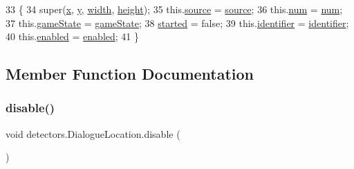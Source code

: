 \begin{DoxyCode}
33                                                                                                            
                                          \{
34         super(\mbox{\hyperlink{classorg_1_1newdawn_1_1slick_1_1geom_1_1_shape_a3e985bfff386c15a4efaad03d8ad60d3}{x}}, \mbox{\hyperlink{classorg_1_1newdawn_1_1slick_1_1geom_1_1_shape_a9f934baded6a1b65ebb69e7e5f80ea00}{y}}, \mbox{\hyperlink{classorg_1_1newdawn_1_1slick_1_1geom_1_1_rectangle_a967e1823f62daf45abb142779d1be62d}{width}}, \mbox{\hyperlink{classorg_1_1newdawn_1_1slick_1_1geom_1_1_rectangle_a3bd010fdce636fc11ed0e0ad4d4b4a0a}{height}});
35         this.\mbox{\hyperlink{classdetectors_1_1_dialogue_location_a55abbd4dc425d54ce35dfae63bd1b1e0}{source}} = \mbox{\hyperlink{classdetectors_1_1_dialogue_location_a55abbd4dc425d54ce35dfae63bd1b1e0}{source}};
36         this.\mbox{\hyperlink{classdetectors_1_1_dialogue_location_ab19469a81933f3e7295fa59d70ac1f1b}{num}} = \mbox{\hyperlink{classdetectors_1_1_dialogue_location_ab19469a81933f3e7295fa59d70ac1f1b}{num}};
37         this.\mbox{\hyperlink{classdetectors_1_1_dialogue_location_a12ac7bef754e0189f746c02f7d82f5e7}{gameState}} = \mbox{\hyperlink{classdetectors_1_1_dialogue_location_a12ac7bef754e0189f746c02f7d82f5e7}{gameState}};
38         \mbox{\hyperlink{classdetectors_1_1_dialogue_location_a980ab73233584dd2c3f336cfea0c8662}{started}} = \textcolor{keyword}{false};
39         this.\mbox{\hyperlink{classdetectors_1_1_dialogue_location_a27a2a136c8c8b9df94946afcddf90e7d}{identifier}} = \mbox{\hyperlink{classdetectors_1_1_dialogue_location_a27a2a136c8c8b9df94946afcddf90e7d}{identifier}};
40         this.\mbox{\hyperlink{classdetectors_1_1_dialogue_location_a724e4fa1eb635dc794cc3a3fde90e947}{enabled}} = \mbox{\hyperlink{classdetectors_1_1_dialogue_location_a724e4fa1eb635dc794cc3a3fde90e947}{enabled}};
41     \}
\end{DoxyCode}


\subsection{Member Function Documentation}
\mbox{\label{classdetectors_1_1_dialogue_location_a6291ee1ebe1a42ba222707cd118ca5a7}} 
\subsubsection{\texorpdfstring{disable()}{disable()}}
{\footnotesize\ttfamily void detectors.\+Dialogue\+Location.\+disable (\begin{DoxyParamCaption}{ }\end{DoxyParamCaption})\hspace{0.3cm}{\ttfamily [inline]}}



